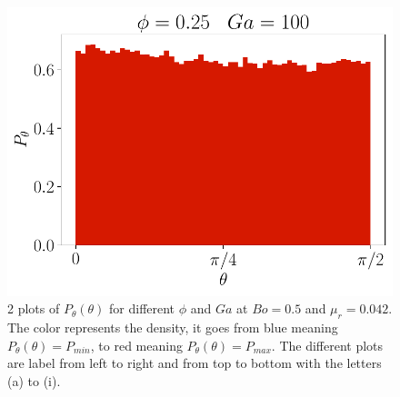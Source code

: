 \begin{figure}[h!]
    \includegraphics[height =\size]{image/N_10/beta/2DMAP_theta_dmin_10_Bo1PHI0_25mu_r0_042Ga100.pdf}
    \caption{2 plots of $P_{\theta}(\theta)$ for different $\phi$ and $Ga$ at $Bo = 0.5$ and $\mu_r = 0.042$. The color represents the density, it goes from blue meaning $P_{\theta}(\theta)= P_{min}$, to red meaning $P_{\theta}(\theta) = P_{max}$. The different plots are label from left to right and from top to bottom with the letters (a) to (i).} 
\end{figure} 
